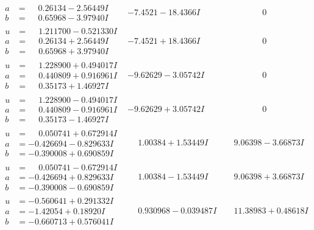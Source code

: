 \documentclass[1p]{elsarticle_modified}
\theoremstyle{definition}
\begin{document}
$$\begin{array}{c|c|c}
\begin{aligned}
a &= \phantom{-}0.26134 - 2.56449 I \\
b &= \phantom{-}0.65968 - 3.97940 I\end{aligned}
 & -7.4521 - 18.4366 I & \phantom{-0.000000 } 0 \\ \hline\begin{aligned}
u &= \phantom{-}1.211700 - 0.521330 I \\
a &= \phantom{-}0.26134 + 2.56449 I \\
b &= \phantom{-}0.65968 + 3.97940 I\end{aligned}
 & -7.4521 + 18.4366 I & \phantom{-0.000000 } 0 \\ \hline\begin{aligned}
u &= \phantom{-}1.228900 + 0.494017 I \\
a &= \phantom{-}0.440809 + 0.916961 I \\
b &= \phantom{-}0.35173 + 1.46927 I\end{aligned}
 & -9.62629 - 3.05742 I & \phantom{-0.000000 } 0 \\ \hline\begin{aligned}
u &= \phantom{-}1.228900 - 0.494017 I \\
a &= \phantom{-}0.440809 - 0.916961 I \\
b &= \phantom{-}0.35173 - 1.46927 I\end{aligned}
 & -9.62629 + 3.05742 I & \phantom{-0.000000 } 0 \\ \hline\begin{aligned}
u &= \phantom{-}0.050741 + 0.672914 I \\
a &= -0.426694 - 0.829633 I \\
b &= -0.390008 + 0.690859 I\end{aligned}
 & \phantom{-}1.00384 + 1.53449 I & \phantom{-}9.06398 - 3.66873 I \\ \hline\begin{aligned}
u &= \phantom{-}0.050741 - 0.672914 I \\
a &= -0.426694 + 0.829633 I \\
b &= -0.390008 - 0.690859 I\end{aligned}
 & \phantom{-}1.00384 - 1.53449 I & \phantom{-}9.06398 + 3.66873 I \\ \hline\begin{aligned}
u &= -0.560641 + 0.291332 I \\
a &= -1.42054 + 0.18920 I \\
b &= -0.660713 + 0.576041 I\end{aligned}
 & \phantom{-}0.930968 - 0.039487 I & \phantom{-}11.38983 + 0.48618 I \\ \hline\begin{aligned}

\end{aligned}
\end{array}$$
\end{document}

